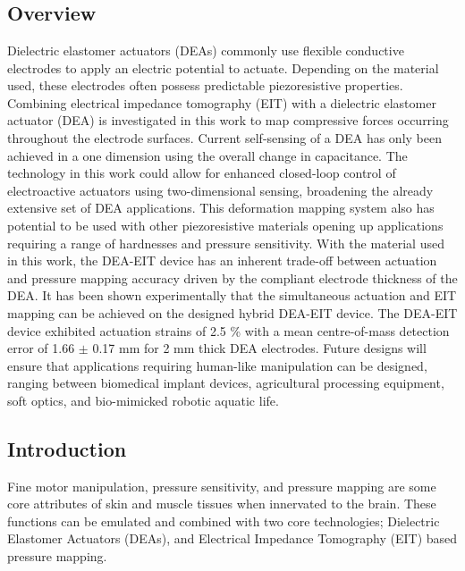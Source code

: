 \chapter{\chapviname}
\label{chapter6}
\section*{Overview}
Dielectric elastomer actuators (DEAs) commonly use flexible conductive electrodes to apply an electric potential to actuate. Depending on the material used, these electrodes often possess predictable piezoresistive properties. Combining electrical impedance tomography (EIT) with a dielectric elastomer actuator (DEA) is investigated in this work to map compressive forces occurring throughout the electrode surfaces. Current self-sensing of a DEA has only been achieved in a one dimension using the overall change in capacitance. The technology in this work could allow for enhanced closed-loop control of electroactive actuators using two-dimensional sensing, broadening the already extensive set of DEA applications. This deformation mapping system also has potential to be used with other piezoresistive materials opening up applications requiring a range of hardnesses and pressure sensitivity. With the material used in this work, the DEA-EIT device has an inherent trade-off between actuation and pressure mapping accuracy driven by the compliant electrode thickness of the DEA. It has been shown experimentally that the simultaneous actuation and EIT mapping can be achieved on the designed hybrid DEA-EIT device. The DEA-EIT device exhibited actuation strains of 2.5 \% with a mean centre-of-mass detection error of 1.66 $\pm$ 0.17 mm for 2 mm thick DEA electrodes. Future designs will ensure that applications requiring human-like manipulation can be designed, ranging between biomedical implant devices, agricultural processing equipment, soft optics, and bio-mimicked robotic aquatic life. 



\section{Introduction} %
\label{sec:introduction}
Fine motor manipulation, pressure sensitivity, and pressure mapping are some core attributes of skin and muscle tissues when innervated to the brain. These functions can be emulated and combined with two core technologies; Dielectric Elastomer Actuators (DEAs), and Electrical Impedance Tomography (EIT) based pressure mapping.

